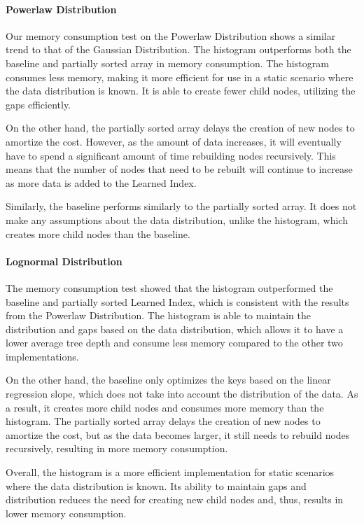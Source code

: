 \documentclass[11pt,a4paper]{article}
\newcommand{\learnindex}{\textsf{Learned Index}\xspace}
\begin{document}
\paragraph{Powerlaw Distribution}
Our memory consumption test on the Powerlaw Distribution shows a similar trend to that of the Gaussian Distribution. The histogram outperforms both the baseline and partially sorted array in memory consumption. The histogram consumes less memory, making it more efficient for use in a static scenario where the data distribution is known. It is able to create fewer child nodes, utilizing the \textsf{gaps} efficiently.

On the other hand, the partially sorted array delays the creation of new nodes to amortize the cost. However, as the amount of data increases, it will eventually have to spend a significant amount of time rebuilding nodes recursively. This means that the number of nodes that need to be rebuilt will continue to increase as more data is added to the \learnindex.

Similarly, the baseline performs similarly to the partially sorted array. It does not make any assumptions about the data distribution, unlike the histogram, which creates more child nodes than the baseline.

\paragraph{Lognormal Distribution}
The memory consumption test showed that the histogram outperformed the baseline and partially sorted \learnindex, which is consistent with the results from the Powerlaw Distribution. The histogram is able to maintain the distribution and gaps based on the data distribution, which allows it to have a lower average tree depth and consume less memory compared to the other two implementations.

On the other hand, the baseline only optimizes the keys based on the linear regression slope, which does not take into account the distribution of the data. As a result, it creates more child nodes and consumes more memory than the histogram. The partially sorted array delays the creation of new nodes to amortize the cost, but as the data becomes larger, it still needs to rebuild nodes recursively, resulting in more memory consumption.

Overall, the histogram is a more efficient implementation for static scenarios where the data distribution is known. Its ability to maintain gaps and distribution reduces the need for creating new child nodes and, thus, results in lower memory consumption.
\end{document}
